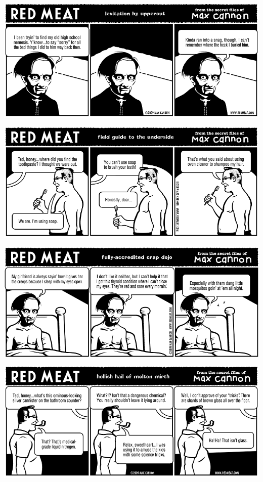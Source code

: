 \documentclass[a4paper,twoside,11pt]{article}
\begin{document}
\includegraphics[width=\textwidth]{redmeat_2009-06-02.png}



\includegraphics[width=\textwidth]{redmeat_2009-06-09.png}



\includegraphics[width=\textwidth]{redmeat_2009-06-16.png}



\includegraphics[width=\textwidth]{redmeat_2009-06-23.png}
\end{document}
